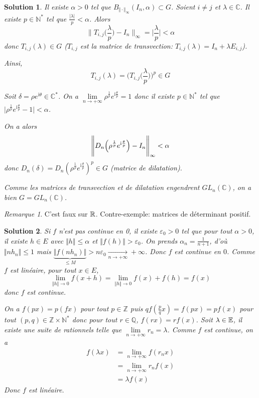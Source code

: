 \documentclass[12pt]{article}
\newtheorem{solution}{Solution}[section]
\theoremstyle{remark}
\newtheorem{remark}{Remarque}[section]
\newcommand{\C}{\mathbb{C}} \newcommand{\Q}{\mathbb{Q}}
\newcommand{\N}{\mathbb{N}} \newcommand{\Z}{\mathbb{Z}}
\numberwithin{equation}{section}
\begin{document}
\begin{solution}
	Il existe $\alpha>0$ tel que $B_{\Vert\cdot\Vert_{\infty}}(I_{n},\alpha)\subset G$. Soient $i\neq j$ et $\lambda\in\C$. Il existe $p\in\N^{*}$ tel que $\frac{\vert\lambda\vert}{p}<\alpha$. Alors 
	$$\Biggl\lVert T_{i,j}\Biggl(\frac{\lambda}{p}\Biggr)-I_{n}\Biggr\rVert_{\infty}=\Biggl\lvert\frac{\lambda}{p}\Biggr\rvert<\alpha$$
	donc $T_{i,j}(\lambda)\in G$ ($T_{i,j}$ est la matrice de transvection: $T_{i,j}(\lambda)=I_{n}+\lambda E_{i,j}$).

	Ainsi,
	$$T_{i,j}(\lambda)=\Biggl(T_{i,j}\Biggl(\frac{\lambda}{p}\Biggr)\Biggr)^{p}\in G$$

	Soit $\delta=\rho e^{\mathrm{i}\theta}\in\C^{*}$. On a $\lim\limits_{n\to+\infty}\rho^{\frac{1}{p}}e^{\mathrm{i}\frac{\theta}{p}}=1$ donc il existe $p\in\N^{*}$ tel que $\vert\rho^{\frac{1}{p}}e^{\mathrm{i}\frac{\theta}{p}}-1\vert<\alpha$.
	
	On a alors
	$$\Biggl\lVert D_{n}\Bigl(\rho^{\frac{1}{p}}e^{\mathrm{i}\frac{\theta}{p}}\Bigr)-I_{n}\Biggr\rVert_{\infty}<\alpha$$
	donc $D_{n}(\delta)=D_{n}(\rho^{\frac{1}{p}}e^{\mathrm{i}\frac{\theta}{p}})^{p}\in G$ (matrice de dilatation).

	Comme les matrices de transvection et de dilatation engendrent $GL_{n}(\C)$, on a bien $G=GL_{n}(\C)$.
\end{solution}

\begin{remark}
	C'est faux sur $\mathbb{R}$. Contre-exemple: matrices de déterminant positif.
\end{remark}

\begin{solution}
	Si $f$ n'est pas continue en 0, il existe $\varepsilon_{0}>0$ tel que pour tout $\alpha>0$, il existe $h\in E$ avec $\Vert h\Vert\leqslant\alpha$ et $\Vert f(h)\Vert>\varepsilon_{0}$. On prends $\alpha_{n}=\frac{1}{n+1}$, d'où $\Vert nh_{n}\Vert\leqslant1$ mais $\underbrace{\Vert f(nh_{n})\Vert}_{\leqslant M}>n\varepsilon_{0}\xrightarrow[n\to+\infty]{}+\infty$. Donc $f$ est continue en $0$. Comme $f$ est linéaire, pour tout $x\in E$,
	$$\lim\limits_{\Vert h\Vert\to0}f(x+h)=\lim\limits_{\Vert h\Vert\to0}f(x)+f(h)=f(x)$$
	donc $f$ est continue.

	On a $f(px)=p(fx)$ pour tout $p\in\Z$ puis $qf(\frac{p}{q}x)=f(px)=pf(x)$ pour tout $(p,q)\in\Z\times\N^{*}$ donc pour tout $r\in\Q$, $f(rx)=rf(x)$.
	Soit $\lambda\in\mathbb{E}$, il existe une suite de rationnels telle que $\lim\limits_{n\to+\infty} r_{n}=\lambda$. Comme $f$ est continue, on a 
	\begin{align*}
		f(\lambda x)
		&=\lim\limits_{n\to+\infty}f(r_{n}x)\\
		&=\lim\limits_{n\to+\infty}r_{n}f(x)\\
		&=\lambda f(x)
	\end{align*}
	Donc $f$ est linéaire.
\end{solution}
\end{document}
